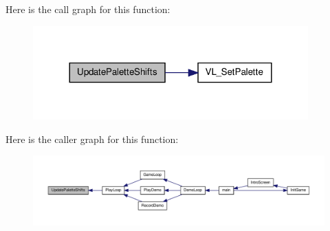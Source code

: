 Here is the call graph for this function:
\nopagebreak
\begin{figure}[H]
\begin{center}
\leavevmode
\includegraphics[width=300pt]{WL__PLAY_8C_a04fa5e7859eabbc20d946b414b5de67b_cgraph}
\end{center}
\end{figure}




Here is the caller graph for this function:
\nopagebreak
\begin{figure}[H]
\begin{center}
\leavevmode
\includegraphics[width=400pt]{WL__PLAY_8C_a04fa5e7859eabbc20d946b414b5de67b_icgraph}
\end{center}
\end{figure}




